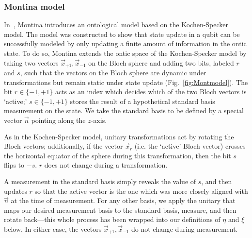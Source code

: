 \documentclass[%
 reprint, onecolumn, 12pt,
superscriptaddress,
nofootinbib,
 prx, 
]{quantumarticle}
\begin{document}
\subsubsection{Montina model}
\label{sec:montina-model}
In~\cite{MontinaDynamicsqubitclassical2012}, Montina introduces an
ontological model based on the Kochen-Specker model. The model was
constructed to show that state update in a qubit can be successfully
modeled by only updating a finite amount of information in the ontic
state. To do so, Montina extends the ontic space of the Kochen-Specker
model by taking two vectors $\vec x_{+1},\vec x_{-1}$ on the Bloch
sphere and adding two bits, labeled $r$ and $s$, such that the vectors
on the Bloch sphere are dynamic under transformations but remain
static under state update (Fig.~\ref{fig:Montmodel}).  The bit
$r\in\{-1,+1\}$ acts as an index which decides which of the two Bloch
vectors is `active;' $s\in\{-1,+1\}$ stores the result of a
hypothetical standard basis measurement on the state. We take the
standard basis to be defined by a special vector $\vec n$ pointing
along the $z$-axis.

As in the Kochen-Specker model, unitary transformations act by
rotating the Bloch vectors; additionally, if the vector $\vec x_r$
(i.e. the `active' Bloch vector) crosses the horizontal equator of the
sphere during this transformation, then the bit $s$ flips to $-s$. $r$
does not change during a transformation.

A measurement in the standard basis simply reveals the value of $s$,
and then updates $r$ so that the active vector is the one which was
more closely aligned with $\vec n$ at the time of measurement. For any
other basis, we apply the unitary that maps our desired measurement
basis to the standard basis, measure, and then rotate back---this
whole process has been wrapped into our definitions of $\eta$ and
$\xi$ below. In either case, the vectors $\vec x_{+1},\vec x_{-1}$ do not
change during measurement.
\end{document}
